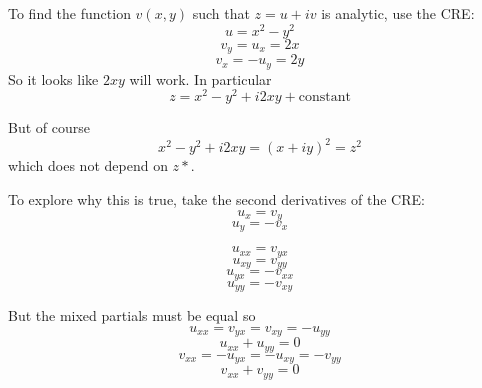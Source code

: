 \documentclass[11pt, oneside]{article}
\begin{document}
To find the function $v(x,y)$ such that $z = u + iv$ is analytic, use the CRE:
\[ u = x^2 - y^2 \]
\[ v_y = u_x = 2x \]
\[ v_x = - u_y = 2y \]
So it looks like $2xy$ will work.  In particular
\[ z = x^2 - y^2 + i2xy + \text{constant} \]

But of course 
\[  x^2 - y^2 + i2xy = (x + iy)^2 = z^2 \]
which does not depend on $z*$.

To explore why this is true, take the second derivatives of the CRE:
\[ u_x = v_y \]
\[ u_y = - v_x \]

\[ u_{xx} = v_{yx} \]
\[ u_{xy} = v_{yy} \]
\[ u_{yx} = -v_{xx} \]
\[ u_{yy} = -v_{xy} \]

But the mixed partials must be equal so
\[ u_{xx} = v_{yx} = v_{xy} = - u_{yy} \]
\[ u_{xx} + u_{yy} = 0 \]
\[ v_{xx} = -u_{yx} = -u_{xy} = -v_{yy} \]
\[ v_{xx} + v_{yy} = 0 \]
\end{document}
